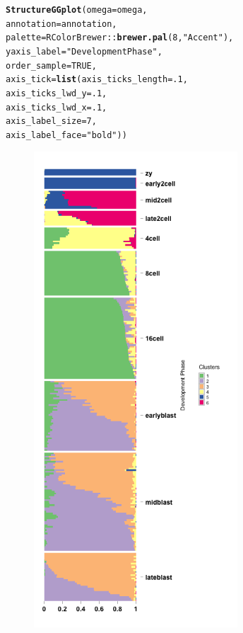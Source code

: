 \documentclass[12pt]{article}\usepackage[]{graphicx}\usepackage[usenames,dvipsnames]{color}
\makeatletter
\newcommand{\hlnum}[1]{\textcolor[rgb]{0.686,0.059,0.569}{#1}}%
\newcommand{\hlstr}[1]{\textcolor[rgb]{0.192,0.494,0.8}{#1}}%
\newcommand{\hlopt}[1]{\textcolor[rgb]{0,0,0}{#1}}%
\newcommand{\hlstd}[1]{\textcolor[rgb]{0.345,0.345,0.345}{#1}}%
\newcommand{\hlkwc}[1]{\textcolor[rgb]{0.333,0.667,0.333}{#1}}%
\newcommand{\hlkwd}[1]{\textcolor[rgb]{0.737,0.353,0.396}{\textbf{#1}}}%
\newenvironment{kframe}{%
 \def\at@end@of@kframe{}%
 \ifinner\ifhmode%
  \def\at@end@of@kframe{\end{minipage}}%
  \begin{minipage}{\columnwidth}%
 \fi\fi%
 \def\FrameCommand##1{\hskip\@totalleftmargin \hskip-\fboxsep
 \colorbox{shadecolor}{##1}\hskip-\fboxsep
     \hskip-\linewidth \hskip-\@totalleftmargin \hskip\columnwidth}%
 \MakeFramed {\advance\hsize-\width
   \@totalleftmargin\z@ \linewidth\hsize
   \@setminipage}}%
 {\par\unskip\endMakeFramed%
 \at@end@of@kframe}
\newenvironment{knitrout}{}{} %
\makeatother
\begin{document}
\begin{knitrout}
\color{fgcolor}\begin{kframe}
\begin{alltt}
\hlkwd{StructureGGplot}\hlstd{(}\hlkwc{omega} \hlstd{= omega,}
                \hlkwc{annotation} \hlstd{= annotation,}
                \hlkwc{palette} \hlstd{= RColorBrewer}\hlopt{::}\hlkwd{brewer.pal}\hlstd{(}\hlnum{8}\hlstd{,} \hlstr{"Accent"}\hlstd{),}
                \hlkwc{yaxis_label} \hlstd{=} \hlstr{"Development Phase"}\hlstd{,}
                \hlkwc{order_sample} \hlstd{=} \hlnum{TRUE}\hlstd{,}
                \hlkwc{axis_tick} \hlstd{=} \hlkwd{list}\hlstd{(}\hlkwc{axis_ticks_length} \hlstd{=} \hlnum{.1}\hlstd{,}
                                 \hlkwc{axis_ticks_lwd_y} \hlstd{=} \hlnum{.1}\hlstd{,}
                                 \hlkwc{axis_ticks_lwd_x} \hlstd{=} \hlnum{.1}\hlstd{,}
                                 \hlkwc{axis_label_size} \hlstd{=} \hlnum{7}\hlstd{,}
                                 \hlkwc{axis_label_face} \hlstd{=} \hlstr{"bold"}\hlstd{))}
\end{alltt}
\end{kframe}
\end{knitrout}

\begin{figure}[htp]
\begin{center}
\includegraphics[width=3in,height=7in]{figure/plot_topic_deng-1}
\end{center}
\end{figure}
\end{document}
